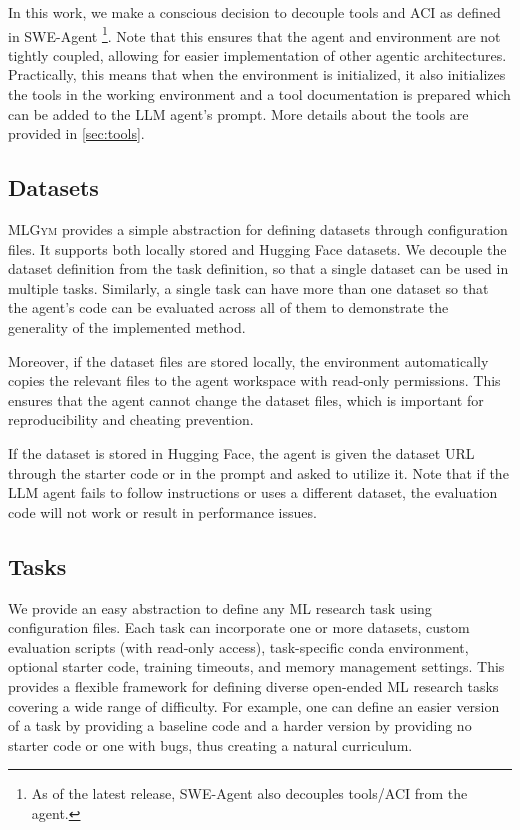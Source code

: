 \documentclass[]{fairmeta}
\newcommand{\mlgym}{\fontfamily{lmr}\selectfont\mdseries\textsc{MLGym}\xspace}
\begin{document}
In this work, we make a conscious decision to decouple tools and ACI as defined in SWE-Agent \citep{yangSWEagentAgentComputerInterfaces2024}\footnote{As of the latest release, SWE-Agent also decouples tools/ACI from the agent.}.
%
Note that this ensures that the agent and environment are not tightly coupled, allowing for easier implementation of other agentic architectures.
%
Practically, this means that when the environment is initialized, it also initializes the tools in the working environment and a tool documentation is prepared which can be added to the LLM agent's prompt. More details about the tools are provided in \autoref{sec:tools}.

\subsection{Datasets} 
\label{sec:datasets}
\mlgym provides a simple abstraction for defining datasets through configuration files.
%
It supports both locally stored and Hugging Face datasets.
%
We decouple the dataset definition from the task definition, so that a single dataset can be used in multiple tasks. Similarly, a single task can have more than one dataset so that the agent's code can be evaluated across all of them to demonstrate the generality of the implemented method.

Moreover, if the dataset files are stored locally, the environment automatically copies the relevant files to the agent workspace with read-only permissions.
%
This ensures that the agent cannot change the dataset files, which is important for reproducibility and cheating prevention.

If the dataset is stored in Hugging Face, the agent is given the dataset URL through the starter code or in the prompt and asked to utilize it. 
%
Note that if the LLM agent fails to follow instructions or uses a different dataset, the evaluation code will not work or result in performance issues.

\subsection{Tasks}
\label{sec:tasks}
We provide an easy abstraction to define any ML research task using configuration files.
%
Each task can incorporate one or more datasets, custom evaluation scripts (with read-only access), task-specific conda environment, optional starter code, training timeouts, and memory management settings.
%
This provides a flexible framework for defining diverse open-ended ML research tasks covering a wide range of difficulty. For example, one can define an easier version of a task by providing a baseline code and a harder version by providing no starter code or one with bugs, thus creating a natural curriculum.
\end{document}
